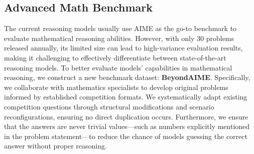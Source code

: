 




\subsection{Advanced Math Benchmark}
The current reasoning models usually use AIME as the go-to benchmark to evaluate mathematical reasoning abilities. However, with only 30 problems released annually, its limited size can lead to high-variance evaluation results, making it challenging to effectively differentiate between state-of-the-art reasoning models. To better evaluate models’ capabilities in mathematical reasoning, we construct a new benchmark dataset: \textbf{BeyondAIME}. Specifically, we collaborate with mathematics specialists to develop original problems informed by established competition formats. We systematically adapt existing competition questions through structural modifications and scenario reconfigurations, ensuring no direct duplication occurs. Furthermore, we ensure that the answers are never trivial values—such as numbers explicitly mentioned in the problem statement—to reduce the chance of models guessing the correct answer without proper reasoning.

